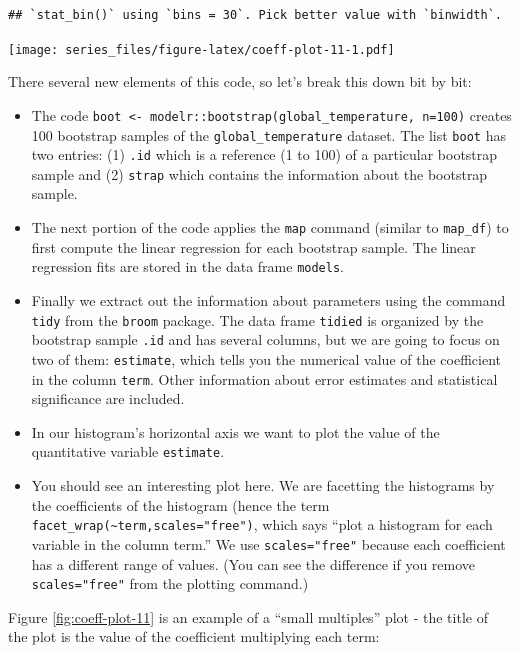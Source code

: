 \documentclass[
]{book}
\providecommand{\tightlist}{%
  \setlength{\itemsep}{0pt}\setlength{\parskip}{0pt}}
\theoremstyle{definition}
\theoremstyle{definition}
\theoremstyle{definition}
\theoremstyle{remark}
\begin{document}
\begin{verbatim}
## `stat_bin()` using `bins = 30`. Pick better value with `binwidth`.
\end{verbatim}

\texttt{[image: series\_files/figure-latex/coeff-plot-11-1.pdf]}

There several new elements of this code, so let's break this down bit by bit:

\begin{itemize}
\tightlist
\item
  The code \texttt{boot\ \textless{}-\ modelr::bootstrap(global\_temperature,\ n=100)} creates 100 bootstrap samples of the \texttt{global\_temperature} dataset. The list \texttt{boot} has two entries: (1) \texttt{.id} which is a reference (1 to 100) of a particular bootstrap sample and (2) \texttt{strap} which contains the information about the bootstrap sample.
\item
  The next portion of the code applies the \texttt{map} command (similar to \texttt{map\_df}) to first compute the linear regression for each bootstrap sample. The linear regression fits are stored in the data frame \texttt{models}.
\item
  Finally we extract out the information about parameters using the command \texttt{tidy} from the \texttt{broom} package. The data frame \texttt{tidied} is organized by the bootstrap sample \texttt{.id} and has several columns, but we are going to focus on two of them: \texttt{estimate}, which tells you the numerical value of the coefficient in the column \texttt{term}. Other information about error estimates and statistical significance are included.
\item
  In our histogram's horizontal axis we want to plot the value of the quantitative variable \texttt{estimate}.\\
\item
  You should see an interesting plot here. We are facetting the histograms by the coefficients of the histogram (hence the term \texttt{facet\_wrap(\textasciitilde{}term,scales="free")}, which says ``plot a histogram for each variable in the column term.'' We use \texttt{scales="free"} because each coefficient has a different range of values. (You can see the difference if you remove \texttt{scales="free"} from the plotting command.)
\end{itemize}

Figure \ref{fig:coeff-plot-11} is an example of a ``small multiples'' plot - the title of the plot is the value of the coefficient multiplying each term:
\end{document}

